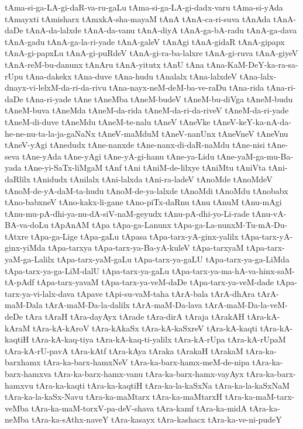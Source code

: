 {tAma-si-ga-LA-gi-daR-va-ru-gaLu
tAma-si-ga-LA-gi-dadx-varu
tAma-si-yAda
tAmayxti
tAmisharx
tAmxkA-sha-mayaM
tAnA
tAnA-ca-ri-suva
tAnAda
tAnA-daDe
tAnA-da-lalxde
tAnA-da-vanu
tAnA-diyA
tAnA-ga-bA-radu
tAnA-ga-dava
tAnA-gadu
tAnA-ga-la-ri-yade
tAnA-galeV
tAnAgi
tAnA-gidaR
tAnA-gipapx
tAnA-gi-papxLu
tAnA-gi-puRdeV
tAnA-gi-ra-ba-lalxre
tAnA-gi-ruva
tAnA-giyeV
tAnA-reM-bu-danunx
tAnAru
tAnA-yitutx
tAnU
tAna
tAna-KaM-DeY-ka-ra-sa-rUpu
tAna-dakekx
tAna-duve
tAna-hudu
tAnalalx
tAna-lalxdeV
tAna-lalx-dnayx-vi-lelxM-da-ri-da-rivu
tAna-nayx-neM-deM-ba-ve-raDu
tAna-rida
tAna-ri-daDe
tAna-ri-yade
tAne
tAneMba
tAneM-budeV
tAneM-bu-diVga
tAneM-budu
tAneM-buva
tAneMda
tAneM-da-rida
tAneM-da-ri-da-riveV
tAneM-da-ri-yade
tAneM-di-duve
tAneMdu
tAneM-te-nalu
tAneV
tAneVke
tAneV-keY-ka-nA-da-he-ne-nu-ta-la-ja-gaNaNx
tAneV-maMduM
tAneV-nanUnx
tAneVneV
tAneVnu
tAneV-yAgi
tAnedudx
tAne-nanxde
tAne-nanx-di-daR-naMdu
tAne-nisi
tAne-seva
tAne-yAda
tAne-yAgi
tAne-yA-gi-hanu
tAne-ya-Lidu
tAne-yaM-ga-mu-Ba-yada
tAne-yi-SaTx-liMgaM
tAnf
tAni
tAniM-de-lilxye
tAniMtu
tAniVta
tAni-daRlilx
tAnidudx
tAnilalx
tAni-lalxda
tAni-ra-ladeV
tAnoMde
tAnoMdeV
tAnoM-de-yA-daM-ta-hudu
tAnoM-de-ya-lalxde
tAnoMdi
tAnoMdu
tAnobabx
tAno-babxneV
tAno-kakx-li-gane
tAno-piTx-daRnu
tAnu
tAnuM
tAnu-mAgi
tAnu-mu-pA-dhi-ya-nu-dA-siV-naM-geyudx
tAnu-pA-dhi-yo-Li-rade
tAnu-vA-BA-va-doLu
tApAnAM
tApa
tApa-ga-Lanunx
tApa-ga-La-nunxM-Tu-mA-Du-tAtxre
tApa-ga-Lige
tApa-gaLu
tApasa
tApa-tarx-yA-ginx-yalilx
tApa-tarx-yA-ginx-yiMda
tApa-tarxya
tApa-tarx-ya-Ba-yA-kuleV
tApa-tarxyaM
tApa-tarx-yaM-ga-Lalilx
tApa-tarx-yaM-gaLu
tApa-tarx-ya-gaLU
tApa-tarx-ya-ga-LiMda
tApa-tarx-ya-ga-LiM-dalU
tApa-tarx-ya-gaLu
tApa-tarx-ya-ma-hA-va-hinx-saM-tA-pAdf
tApa-tarx-yavaM
tApa-tarx-ya-veM-daDe
tApa-tarx-ya-veM-dade
tApa-tarx-ya-vi-lalx-dava
tApave
tApi-su-vaM-taha
tArA-bala
tArA-dhAra
tArA-maM-Dala
tArA-maM-Da-la-dalilx
tArA-maM-Da-lava
tArA-maM-Da-la-veM-deDe
tAra
tAraH
tAra-dayAyx
tArade
tAra-dirA
tAraja
tArakAH
tAra-kA-kAraM
tAra-kA-kAroV
tAra-kAkaSx
tAra-kA-kaSxreV
tAra-kA-kaqti
tAra-kA-kaqtiH
tAra-kA-kaq-tiya
tAra-kA-kaq-ti-yalilx
tAra-kA-rUpa
tAra-kA-rUpaM
tAra-kA-rU-pavA
tAra-kAtf
tAra-kAya
tAraka
tArakaH
tArakaM
tAra-ka-barxhamx
tAra-ka-barx-hamxNeV
tAra-ka-barx-hamx-meM-de-nipa
tAra-ka-barx-hamxva
tAra-ka-barx-hamx-vanu
tAra-ka-barx-hamx-vayAyx
tAra-ka-barx-hamxvu
tAra-ka-kaqti
tAra-ka-kaqtiH
tAra-ka-la-kaSxNa
tAra-ka-la-kaSxNaM
tAra-ka-la-kaSx-Navu
tAra-ka-maMtarx
tAra-ka-maMtarxH
tAra-ka-maM-tarx-veMba
tAra-ka-maM-torxV-pa-deV-shava
tAra-kamf
tAra-ka-midA
tAra-ka-neMba
tAra-ka-sAthx-naveY
tAra-kasayx
tAra-kashacx
tAra-ka-ve-ni-pudeY
}

